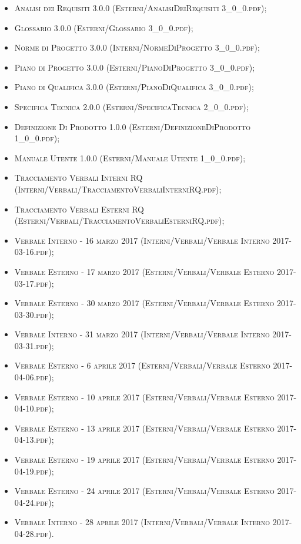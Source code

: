 \documentclass[11pt,a4paper]{letter}
\begin{document}
\begin{letter}
\begin{itemize}
	\item \textsc{Analisi dei Requisiti 3.0.0 (Esterni/AnalisiDeiRequisiti 3\_0\_0.pdf)}; 
	\item \textsc{Glossario 3.0.0 (Esterni/Glossario 3\_0\_0.pdf)}; 
	\item \textsc{Norme di Progetto 3.0.0 (Interni/NormeDiProgetto 3\_0\_0.pdf)}; 
	\item \textsc{Piano di Progetto 3.0.0 (Esterni/PianoDiProgetto 3\_0\_0.pdf)}; 
	\item \textsc{Piano di Qualifica 3.0.0 (Esterni/PianoDiQualifica 3\_0\_0.pdf)}; 
	\item \textsc{Specifica Tecnica 2.0.0 (Esterni/SpecificaTecnica 2\_0\_0.pdf)};
	\item \textsc{Definizione Di Prodotto 1.0.0 (Esterni/DefinizioneDiProdotto 1\_0\_0.pdf)};
	\item \textsc{Manuale Utente 1.0.0 (Esterni/Manuale Utente 1\_0\_0.pdf)};
	\item \textsc{Tracciamento Verbali Interni RQ (Interni/Verbali/TracciamentoVerbaliInterniRQ.pdf)};
	\item \textsc{Tracciamento Verbali Esterni RQ (Esterni/Verbali/TracciamentoVerbaliEsterniRQ.pdf)};
	\item \textsc{Verbale Interno - 16 marzo 2017 (Interni/Verbali/Verbale Interno 2017-03-16.pdf)};
	\item \textsc{Verbale Esterno - 17 marzo 2017 (Esterni/Verbali/Verbale Esterno 2017-03-17.pdf)};
	\item \textsc{Verbale Esterno - 30 marzo 2017 (Esterni/Verbali/Verbale Esterno 2017-03-30.pdf)}; 
	\item \textsc{Verbale Interno - 31 marzo 2017 (Interni/Verbali/Verbale Interno 2017-03-31.pdf)}; 
	\item \textsc{Verbale Esterno - 6 aprile 2017 (Esterni/Verbali/Verbale Esterno 2017-04-06.pdf)}; 
	\item \textsc{Verbale Esterno - 10 aprile 2017 (Esterni/Verbali/Verbale Esterno 2017-04-10.pdf)}; 
	\item \textsc{Verbale Esterno - 13 aprile 2017 (Esterni/Verbali/Verbale Esterno 2017-04-13.pdf)}; 
	\item \textsc{Verbale Esterno - 19 aprile 2017 (Esterni/Verbali/Verbale Esterno 2017-04-19.pdf)}; 
	\item \textsc{Verbale Esterno - 24 aprile 2017 (Esterni/Verbali/Verbale Esterno 2017-04-24.pdf)};
	\item \textsc{Verbale Interno - 28 aprile 2017 (Interni/Verbali/Verbale Interno 2017-04-28.pdf)}. 
\end{itemize}


\end{letter}
\end{document}
